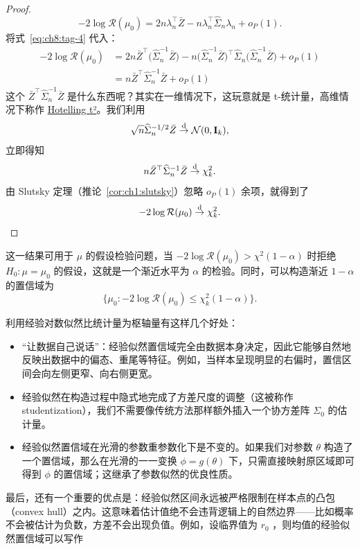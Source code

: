 \begin{proof}
\[
-2\log \mathcal R(\mu_0)
=2n\lambda_n^\top\bar{Z}
-n\lambda_n^\top \widehat\Sigma_n\lambda_n+o_P(1).
\]
将式~\eqref{eq:ch8:tag-4} 代入：
\[\begin{aligned} -2\log \mathcal R(\mu_0)&=2n\bar{Z}^\top\big(\widehat\Sigma_n^{-1}\bar{Z}\big)-n \big(\widehat\Sigma_n^{-1}\bar{Z}\big)^\top \widehat\Sigma_n\big(\widehat\Sigma_n^{-1}\bar{Z}\big)+ o_P(1)  \\ &=n\bar{Z}^\top\widehat\Sigma_n^{-1}\bar{Z}+ o_P(1)   \end{aligned}\]
这个 $\bar{Z}^\top\widehat\Sigma_n^{-1}\bar{Z}$ 是什么东西呢？其实在一维情况下，这玩意就是 t-统计量，高维情况下称作 \href{https://en.wikipedia.org/wiki/Hotelling\%27s_T-squared_distribution\#Hotelling_t-squared_statistic}{Hotelling t²}。我们利用
\[
\sqrt n\widehat\Sigma_n^{-1/2}\bar{Z}\overset{\rm d}\to \mathcal N(0,\mathbf I_k),
\]
立即得知
\[
n\bar{Z}^\top\widehat\Sigma_n^{-1}\bar{Z}\overset{\rm d}\to \chi_k^2.
\]
由 Slutsky 定理（推论~\ref{cor:ch1:slutsky}）忽略 $o_P(1)$ 余项，就得到了
\[
-2\log\mathcal R(\mu_0)\overset{\rm d}\to \chi_k^2.
\]

\end{proof}

这一结果可用于 $\mu$ 的假设检验问题，当 $-2\log\mathcal R(\mu_0)>\chi^2(1-\alpha)$ 时拒绝 $H_0:\mu=\mu_0$ 的假设，这就是一个渐近水平为 $\alpha$ 的检验。同时，可以构造渐近 $1-\alpha$ 的置信域为
\[
\{\mu_0 :-2\log \mathcal{R}(\mu_0) \le \chi^2_k(1-\alpha)\}.
\]

利用经验对数似然比统计量为枢轴量有这样几个好处：

\begin{itemize}
\tightlist
\item
  ``让数据自己说话''：经验似然置信域完全由数据本身决定，因此它能够自然地反映出数据中的偏态、重尾等特征。例如，当样本呈现明显的右偏时，置信区间会向左侧更窄、向右侧更宽。
\item
  经验似然在构造过程中隐式地完成了方差尺度的调整（这被称作 studentization），我们不需要像传统方法那样额外插入一个协方差阵 $\Sigma_0$ 的估计量。
\item
  经验似然置信域在光滑的参数重参数化下是不变的。如果我们对参数 $\theta$ 构造了一个置信域，那么在光滑的一一变换 $\phi = g(\theta)$ 下，只需直接映射原区域即可得到 $\phi$ 的置信域；这继承了参数似然的优良性质。
\end{itemize}

最后，还有一个重要的优点是：经验似然区间永远被严格限制在样本点的凸包（convex hull）之内。这意味着估计值绝不会违背逻辑上的自然边界------比如概率不会被估计为负数，方差不会出现负值。例如，设临界值为 $r_0$ ，则均值的经验似然置信域可以写作 

